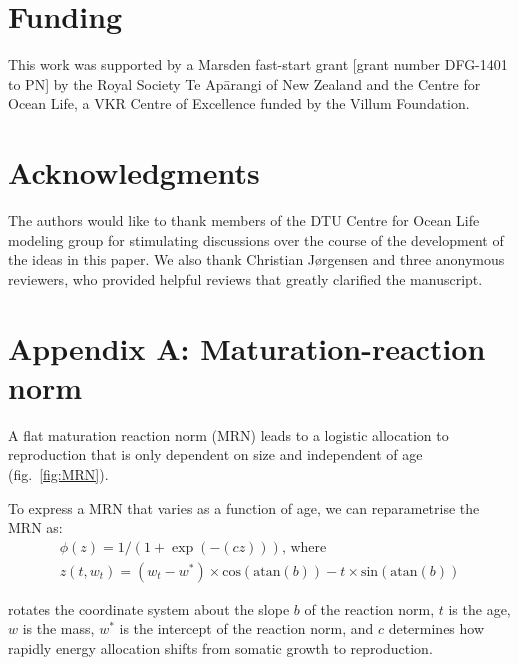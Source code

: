 \documentclass[11pt]{article}\usepackage[]{graphicx}\usepackage[]{color,soul}
\begin{document}
\section*{Funding}

This work was supported by a Marsden fast-start grant [grant number DFG-1401 to PN] by the Royal Society Te Apārangi of New Zealand and the Centre for Ocean Life, a VKR Centre of Excellence funded by the Villum Foundation.

 \section*{Acknowledgments}
 
The authors would like to thank members of the DTU Centre for Ocean Life modeling group for stimulating discussions over the course of the development of the ideas in this paper. We also thank Christian Jørgensen and three anonymous reviewers, who provided helpful reviews that greatly clarified the manuscript.

\newpage{}


\section*{Appendix A: Maturation-reaction norm}
\label{sec:MRN}

A flat maturation reaction norm (MRN) leads to a logistic allocation to reproduction that is only dependent on size and independent of age (fig.~\ref{fig:MRN}).

To express a MRN that varies as a function of age, we can reparametrise the MRN as:
\begin{align}
\phi(z) = 1/(1+\exp(-(c z))) \text{, where }\\
z(t, w_t) = (w_t-w^*)\times \text{cos}(\text{atan}(b))-t\times \text{sin}(\text{atan}(b))
\end{align}

rotates the coordinate system about the slope $b$ of the reaction norm, $t$ is the age, $w$ is the mass, $w^*$ is the intercept of the reaction norm, and $c$ determines how rapidly energy allocation shifts from somatic growth to reproduction. 

\newpage
\end{document}
